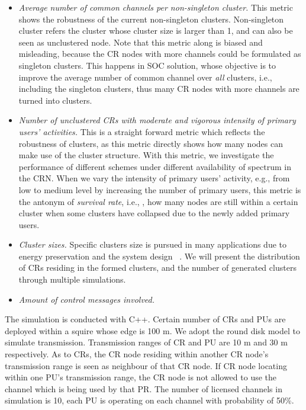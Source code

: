 \documentclass[journal,comsoc]{IEEEtran}
\theoremstyle{mytheoremstyle}
\theoremstyle{mytheoremstyle}
\theoremstyle{mytheoremstyle}
\newcommand{\eg}{e.g., }
\newcommand{\ie}{i.e., }
\begin{document}
\begin{itemize}
\item \textit{Average number of common channels per non-singleton cluster.} 
This metric shows the robustness of the current non-singleton clusters.
Non-singleton cluster refers the cluster whose cluster size is larger than 1, and can also be seen as unclustered node.
Note that this metric along is biased and misleading, because the CR nodes with more channels could be formulated as singleton clusters.
This happens in SOC solution, whose objective is to improve the average number of common channel over \textit{all} clusters, \ie including the singleton clusters, thus many CR nodes with more channels are turned into clusters.


\item \textit{Number of unclustered CRs with moderate and vigorous intensity of primary users' activities.}
This is a straight forward metric which reflects the robustness of clusters, as this metric directly shows how many nodes can make use of the cluster structure.
With this metric, we investigate the performance of different schemes under different availability of spectrum in the CRN.
When we vary the intensity of primary users' activity, \eg from low to medium level by increasing the number of primary users, this metric is the antonym of \textit{survival rate}, \ie, how many nodes are still within a certain cluster when some clusters have collapsed due to the newly added primary users.


\item \textit{Cluster sizes.}
Specific clusters size is pursued in many applications due to energy preservation and the system design ~\cite{clustering_globecom11}.
We will present the distribution of CRs residing in the formed clusters, and the number of generated clusters through multiple simulations.

\item \textit{Amount of control messages involved.}

\end{itemize}

The simulation is conducted with C++. 
Certain number of CRs and PUs are deployed within a squire whose edge is 100 m.
We adopt the round disk model to simulate transmission.
Transmission ranges of CR and PU are 10 m and 30 m respectively.
As to CRs, the CR node residing within another CR node's transmission range is seen as neighbour of that CR node.
If CR node locating within one PU's transmission range, the CR node is not allowed to use the channel which is being used by that PR.
The number of licensed channels in simulation is 10, each PU is operating on each channel with probability of 50\%.
\end{document}
